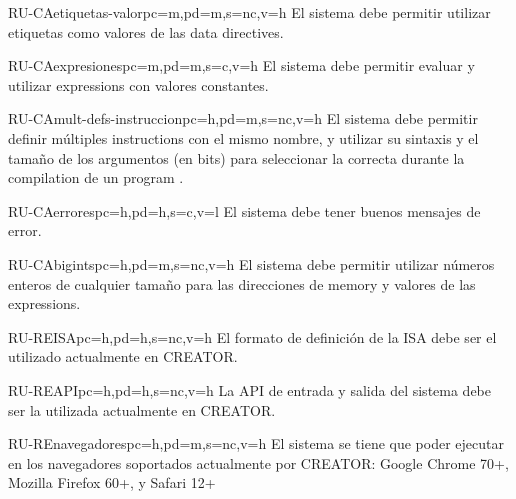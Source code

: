 \begin{userReq}{RU-CA}{etiquetas-valor}{pc=m,pd=m,s=nc,v=h}
    El sistema debe permitir utilizar etiquetas como valores de las \glspl{data directive}.
\end{userReq}

\begin{userReq}{RU-CA}{expresiones}{pc=m,pd=m,s=c,v=h}
    El sistema debe permitir evaluar y utilizar \glspl{expression} con valores
    constantes.
\end{userReq}

\begin{userReq}{RU-CA}{mult-defs-instruccion}{pc=h,pd=m,s=nc,v=h}
    El sistema debe permitir definir múltiples \glspl{instruction} con el mismo
    nombre, y utilizar su sintaxis y el tamaño de los argumentos (en bits) para
    seleccionar la correcta durante la \gls{compilation} de un \gls{program}
    .
\end{userReq}

\begin{userReq}{RU-CA}{errores}{pc=h,pd=h,s=c,v=l}
    El sistema debe tener buenos mensajes de error.
\end{userReq}

\begin{userReq}{RU-CA}{bigints}{pc=h,pd=m,s=nc,v=h}
    El sistema debe permitir utilizar números enteros de cualquier tamaño para
    las direcciones de \gls{memory} y valores de las \glspl{expression}.
\end{userReq}


\begin{userReq}{RU-RE}{ISA}{pc=h,pd=h,s=nc,v=h}
    El formato de definición de la \gls{ISA} debe ser el utilizado
    actualmente en CREATOR.
\end{userReq}

\begin{userReq}{RU-RE}{API}{pc=h,pd=h,s=nc,v=h}
    La \gls{API} de entrada y salida del sistema debe ser la utilizada
    actualmente en CREATOR.
\end{userReq}

\begin{userReq}{RU-RE}{navegadores}{pc=h,pd=m,s=nc,v=h}
    El sistema se tiene que poder ejecutar en los navegadores soportados
    actualmente por CREATOR: Google Chrome 70+, Mozilla Firefox 60+, y Safari
    12+
\end{userReq}

